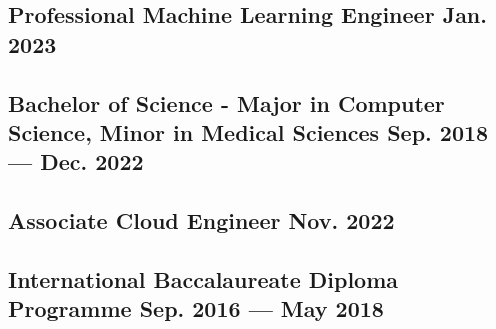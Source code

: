 \documentclass[letter,10pt]{article}
\begin{document}
\subsection{{Professional Machine Learning Engineer \hfill Jan. 2023}}

\vspace{1.25em}

\subsection{{Bachelor of Science - Major in Computer Science, Minor in Medical Sciences \hfill Sep. 2018 --- Dec. 2022}}

\vspace{1.25em}

\subsection{{Associate Cloud Engineer \hfill Nov. 2022}}

\vspace{1.25em}

\subsection{{International Baccalaureate Diploma Programme \hfill Sep. 2016 --- May 2018}}

\vspace{1.25em}
\end{document}
